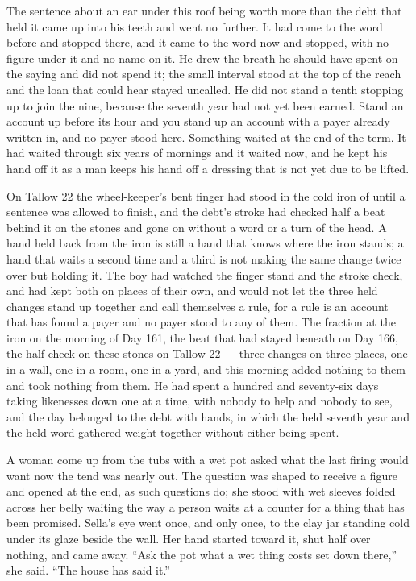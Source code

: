 \scenebreak

The sentence about an ear under this roof being worth more than the debt that held it came up into his teeth and went no further. It had come to the word before and stopped there, and it came to the word now and stopped, with no figure under it and no name on it. He drew the breath he should have spent on the saying and did not spend it; the small interval stood at the top of the reach and the loan that could hear stayed uncalled. He did not stand a tenth stopping up to join the nine, because the seventh year had not yet been earned. Stand an account up before its hour and you stand up an account with a payer already written in, and no payer stood here. Something waited at the end of the term. It had waited through six years of mornings and it waited now, and he kept his hand off it as a man keeps his hand off a dressing that is not yet due to be lifted.

On Tallow 22 the wheel-keeper's bent finger had stood in the cold iron of  until a sentence was allowed to finish, and the debt's stroke had checked half a beat behind it on the stones and gone on without a word or a turn of the head. A hand held back from the iron is still a hand that knows where the iron stands; a hand that waits a second time and a third is not making the same change twice over but holding it. The boy had watched the finger stand and the stroke check, and had kept both on places of their own, and would not let the three held changes stand up together and call themselves a rule, for a rule is an account that has found a payer and no payer stood to any of them. The fraction at the iron on the morning of Day 161, the beat that had stayed beneath  on Day 166, the half-check on these stones on Tallow 22 --- three changes on three places, one in a wall, one in a room, one in a yard, and this morning added nothing to them and took nothing from them. He had spent a hundred and seventy-six days taking likenesses down one at a time, with nobody to help and nobody to see, and the day belonged to the debt with hands, in which the held seventh year and the held word gathered weight together without either being spent.

A woman come up from the tubs with a wet pot asked what the last firing would want now the tend was nearly out. The question was shaped to receive a figure and opened at the end, as such questions do; she stood with wet sleeves folded across her belly waiting the way a person waits at a counter for a thing that has been promised. Sella's eye went once, and only once, to the clay jar standing cold under its glaze beside the wall. Her hand started toward it, shut half over nothing, and came away. “Ask the pot what a wet thing costs set down there,” she said. “The house has said it.”

